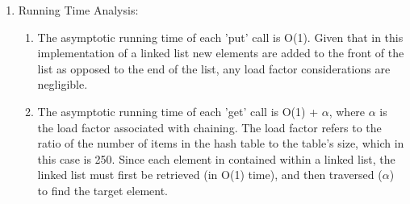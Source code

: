 \documentclass[letterpaper, 10pt,DIV=13]{scrartcl}
\numberwithin{equation}{section} %
\numberwithin{figure}{section} %
\numberwithin{table}{section} %
\begin{document}
\begin{enumerate}
    \item Running Time Analysis: 
    \begin{enumerate}
        \item The asymptotic running time of each 'put' call is O(1). Given that in this implementation of a linked list new elements are added to the front of the list as opposed to the end of the list, any load factor considerations are negligible. 
        \item The asymptotic running time of each 'get' call is O(1) + $\alpha$, where $\alpha$ is the load factor associated with chaining. The load factor refers to the ratio of the number of items in the hash table to the table's size, which in this case is 250. Since each element in contained within a linked list, the linked list must first be retrieved (in O(1) time), and then traversed ($\alpha$) to find the target element.
    \end{enumerate}
\end{enumerate}
\end{document}
